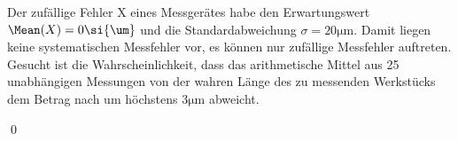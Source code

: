 \documentclass{abgabe}
\begin{document}
\begin{questions}
    \question
    Der zufällige Fehler X eines Messgerätes habe den Erwartungswert $\Mean(X) = 0 \si{\um}$ und die Standardabweichung $\sigma = 20 \si{\um}$. 
    Damit liegen keine systematischen Messfehler vor, es können nur zufällige Messfehler auftreten. 
    Gesucht ist die Wahrscheinlichkeit, dass das arithmetische Mittel aus 25 unabhängigen Messungen von der wahren Länge des zu messenden Werkstücks dem Betrag nach um höchstens $3 \si{\um}$ abweicht.
    \begin{solution}

        \qed
    \end{solution}
\end{questions}
\end{document}
